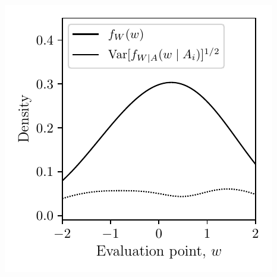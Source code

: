 \documentclass{article}
\begin{document}
\includegraphics[scale=0.5]{graphics/distribution_plot_none.pdf}
\end{document}
